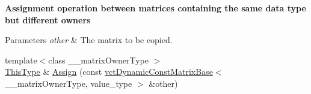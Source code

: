 \begin{Indent}{\bf Assignment operation between matrices containing the same data type but different owners}\par
{\em 
\begin{DoxyParams}{Parameters}
{\em other} & The matrix to be copied. \\
\hline
\end{DoxyParams}
}\begin{DoxyCompactItemize}
\item 
{\footnotesize template$<$class \+\_\+\+\_\+matrix\+Owner\+Type $>$ }\\\hyperlink{classvct_dynamic_const_matrix_base_ac4ff48cbe4d9de3fdef5a02447ffb9db}{This\+Type} \& \hyperlink{classvct_dynamic_matrix_base_a2f080a67dc52e906f0219bbc924febbc}{Assign} (const \hyperlink{classvct_dynamic_const_matrix_base}{vct\+Dynamic\+Const\+Matrix\+Base}$<$ \+\_\+\+\_\+matrix\+Owner\+Type, value\+\_\+type $>$ \&other)
\end{DoxyCompactItemize}
\end{Indent}
